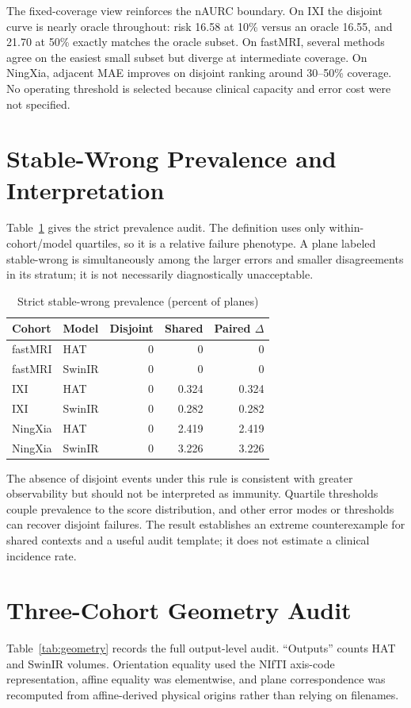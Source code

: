 \documentclass[journal,10pt]{IEEEtran}
\begin{document}
The fixed-coverage view reinforces the nAURC boundary. On IXI the disjoint curve is nearly oracle throughout: risk 16.58 at 10\% versus an oracle 16.55, and 21.70 at 50\% exactly matches the oracle subset. On fastMRI, several methods agree on the easiest small subset but diverge at intermediate coverage. On NingXia, adjacent MAE improves on disjoint ranking around 30--50\% coverage. No operating threshold is selected because clinical capacity and error cost were not specified.

\section{Stable-Wrong Prevalence and Interpretation}
Table~\ref{tab:stablewrong} gives the strict prevalence audit. The definition uses only within-cohort/model quartiles, so it is a relative failure phenotype. A plane labeled stable-wrong is simultaneously among the larger errors and smaller disagreements in its stratum; it is not necessarily diagnostically unacceptable.

\begin{table}[t]
\caption{Strict stable-wrong prevalence (percent of planes)}
\label{tab:stablewrong}\centering
\begin{tabular}{llrrr}
\toprule
Cohort&Model&Disjoint&Shared&Paired $\Delta$\\
\midrule
fastMRI&HAT&0&0&0\\
fastMRI&SwinIR&0&0&0\\
IXI&HAT&0&0.324&0.324\\
IXI&SwinIR&0&0.282&0.282\\
NingXia&HAT&0&2.419&2.419\\
NingXia&SwinIR&0&3.226&3.226\\
\bottomrule
\end{tabular}
\end{table}

The absence of disjoint events under this rule is consistent with greater observability but should not be interpreted as immunity. Quartile thresholds couple prevalence to the score distribution, and other error modes or thresholds can recover disjoint failures. The result establishes an extreme counterexample for shared contexts and a useful audit template; it does not estimate a clinical incidence rate.

\section{Three-Cohort Geometry Audit}
Table~\ref{tab:geometry} records the full output-level audit. ``Outputs'' counts HAT and SwinIR volumes. Orientation equality used the NIfTI axis-code representation, affine equality was elementwise, and plane correspondence was recomputed from affine-derived physical origins rather than relying on filenames.
\end{document}
